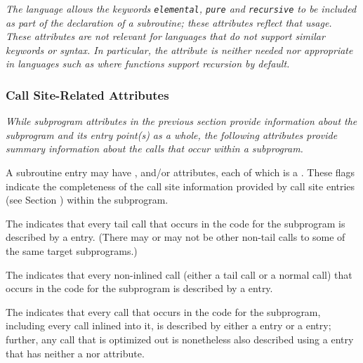 \textit{The  
language allows the keywords \texttt{elemental}, \texttt{pure}
and \texttt{recursive} to be included as part of the declaration of
a subroutine; these attributes reflect that usage. These
attributes are not relevant for languages that do not support
similar keywords or syntax. In particular, the \DWATrecursiveNAME{}
attribute is neither needed nor appropriate in languages such
as  where functions support recursion by default.}


\subsubsection{Call Site-Related Attributes}
\textit{While subprogram attributes in the previous section provide
information about the subprogram and its entry point(s) as a whole,
the following attributes provide summary information about the calls
that occur within a subprogram.}

A subroutine entry may have \DWATcallalltailcalls, 
\DWATcallallcalls{} and/or \DWATcallallsourcecalls{} 
attributes, each of which is a \CLASSflag.
These flags indicate the completeness of the call site 
information provided by call site entries (see 
Section ) within the subprogram.

The \DWATcallalltailcallsDEFN{}
indicates that every tail call 
that occurs in the code for the subprogram is described by a 
\DWTAGcallsite{} entry. 
(There may or may not be other non-tail calls to some of the same 
target subprograms.)

The \DWATcallallcallsDEFN{}
indicates that every non-inlined call
(either a tail call or a normal call) that occurs in the code for the subprogram
is described by a \DWTAGcallsite{} entry.

The \DWATcallallsourcecallsDEFN{}
indicates that every call that occurs in the
code for the subprogram, including every call inlined into it, is described by either a 
\DWTAGcallsite{} entry or a \DWTAGinlinedsubroutine{} entry; further, any call
that is optimized out is nonetheless also described using a \DWTAGcallsite{} entry 
that has neither a \DWATcallpc{} nor \DWATcallreturnpc{} attribute.


